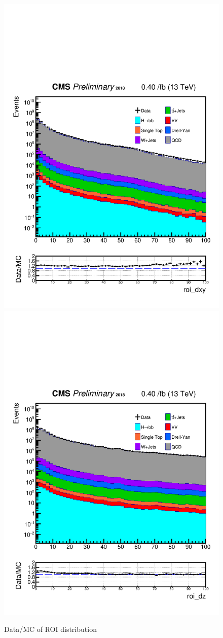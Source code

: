 \begin{figure}[h!]
  \caption{Data/MC of ROI distribution}
  \label{fig:ROIs}
  \centering
  \includegraphics[width=0.47\linewidth]{figs/Data_AnalysisNoteplot_MS-15_ctauS-10_roi_dxy.pdf}
  \includegraphics[width=0.47\linewidth]{figs/Data_AnalysisNoteplot_MS-15_ctauS-10_roi_dz.pdf}
\end{figure}

